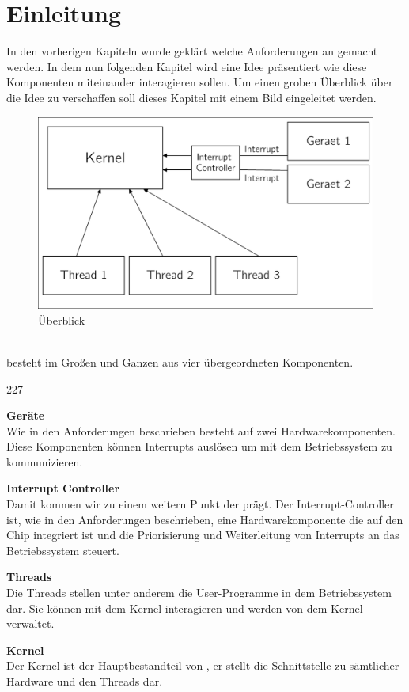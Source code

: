 \section{Einleitung}
In den vorherigen Kapiteln wurde gekl\"art welche Anforderungen an \mops gemacht werden. In dem nun folgenden Kapitel wird eine Idee pr\"asentiert wie diese Komponenten miteinander interagieren sollen. Um einen groben \"Uberblick \"uber die Idee zu verschaffen soll dieses Kapitel mit einem Bild eingeleitet werden.
\begin{figure}[h!]
	\centering
	\includegraphics[scale=0.60]{common/draft-overview.pdf}	
	\caption{\mops \"Uberblick}
	\label{draft:overview}
\end{figure}\\
\mops besteht im Gro\ss en und Ganzen aus vier \"ubergeordneten Komponenten. 
\begin{dinglist}{227}
	\item{\textbf{Ger\"ate}} \\ 
	Wie in den Anforderungen beschrieben besteht \mops auf zwei Hardwarekomponenten. Diese Komponenten k\"onnen Interrupts ausl\"osen um mit dem Betriebssystem zu kommunizieren.
	\item{\textbf{Interrupt Controller}} \\
	Damit kommen wir zu einem weitern Punkt der \mops pr\"agt. Der Interrupt-Controller ist, wie in den Anforderungen beschrieben, eine Hardwarekomponente die auf den Chip integriert ist und die Priorisierung und Weiterleitung von Interrupts an das Betriebssystem steuert.
	\item{\textbf{Threads}} \\
	Die Threads stellen unter anderem die User-Programme in dem Betriebssystem dar. Sie k\"onnen mit dem Kernel interagieren und werden von dem Kernel verwaltet.
	\item{\textbf{Kernel}} \\ 
	Der Kernel ist der Hauptbestandteil von \mops, er stellt die Schnittstelle zu s\"amtlicher Hardware und den Threads dar.
\end{dinglist}
